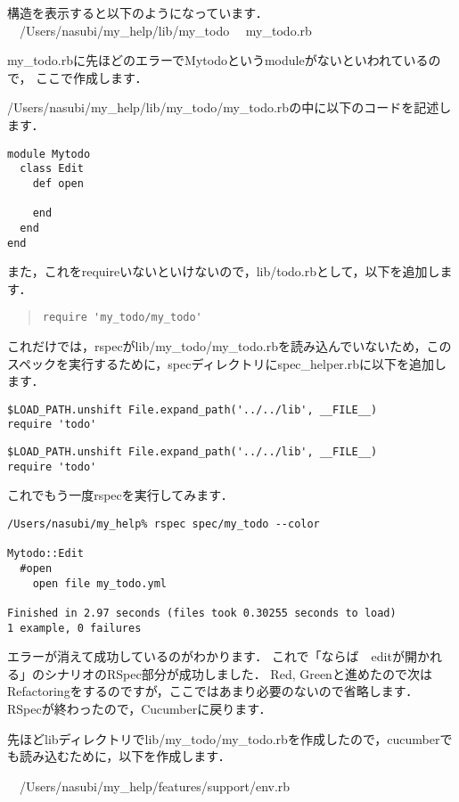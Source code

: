 構造を表示すると以下のようになっています．
　/Users/nasubi/my\_help/lib/my\_todo%
　my\_todo.rb

my\_todo.rbに先ほどのエラーでMytodoというmoduleがないといわれているので，
ここで作成します．

/Users/nasubi/my\_help/lib/my\_todo/my\_todo.rbの中に以下のコードを記述します．
\begin{lstlisting}[style=customCsh,basicstyle={\scriptsize\ttfamily}]
module Mytodo
  class Edit
    def open

    end
  end
end
\end{lstlisting}
また，これをrequireいないといけないので，lib/todo.rbとして，以下を追加します．
\begin{quote}\begin{verbatim}
require 'my_todo/my_todo'
\end{verbatim}\end{quote}
これだけでは，rspecがlib/my\_todo/my\_todo.rbを読み込んでいないため，このスペックを実行するために，specディレクトリにspec\_helper.rbに以下を追加します．
\begin{lstlisting}[style=customCsh,basicstyle={\scriptsize\ttfamily}]
$LOAD_PATH.unshift File.expand_path('../../lib', __FILE__)
require 'todo'
\end{lstlisting}\begin{lstlisting}[style=customRuby,basicstyle={\scriptsize\ttfamily}]
$LOAD_PATH.unshift File.expand_path('../../lib', __FILE__)
require 'todo'
\end{lstlisting}
これでもう一度rspecを実行してみます．
\begin{lstlisting}[style=customCsh,basicstyle={\scriptsize\ttfamily}]
/Users/nasubi/my_help% rspec spec/my_todo --color

Mytodo::Edit
  #open
    open file my_todo.yml

Finished in 2.97 seconds (files took 0.30255 seconds to load)
1 example, 0 failures

\end{lstlisting}
エラーが消えて成功しているのがわかります．
これで「ならば　editが開かれる」のシナリオのRSpec部分が成功しました．
Red, Greenと進めたので次はRefactoringをするのですが，ここではあまり必要のないので省略します．
RSpecが終わったので，Cucumberに戻ります．

先ほどlibディレクトリでlib/my\_todo/my\_todo.rbを作成したので，cucumberでも読み込むために，以下を作成します．

　/Users/nasubi/my\_help/features/support/env.rb

